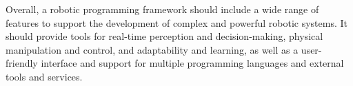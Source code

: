 \documentclass[%
oneside,    %
project,    %
nosummary   %
]{USN-MSc}
\begin{document}
Overall, a robotic programming framework should include a wide range of features to support the development of complex and powerful robotic systems. It should provide tools for real-time perception and decision-making, physical manipulation and control, and adaptability and learning, as well as a user-friendly interface and support for multiple programming languages and external tools and services.


~\nocite{*}

\cleardoublepage

\printbibliography[heading=bibintoc, title={References}]




%
%
%
%
%
%
\end{document}
